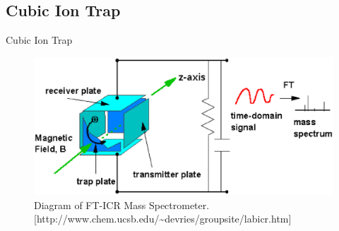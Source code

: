\documentclass[t,compress,athserif,xcolor=pst,dvips]{beamer}
\begin{document}
	\subsection{Cubic Ion Trap}
	\begin{frame}[c]{Cubic Ion Trap}
		\begin{center}
			\begin{figure}
				\includegraphics[scale=.42]{schematic_fixed.eps}
				\caption{Diagram of FT-ICR Mass Spectrometer. [http://www.chem.ucsb.edu/\textasciitilde devries/groupsite/labicr.htm]}
			\end{figure}
		\end{center}
	\end{frame}
	
\end{document}
